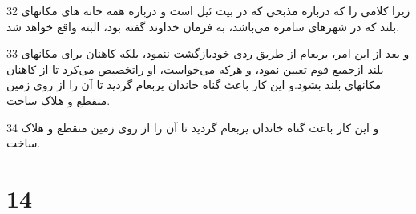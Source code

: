 \par 32 زیرا کلامی را که درباره مذبحی که در بیت ئیل است و درباره همه خانه های مکانهای بلند که در شهرهای سامره می‌باشد، به فرمان خداوند گفته بود، البته واقع خواهد شد.
\par 33 و بعد از این امر، یربعام از طریق ردی خودبازگشت ننمود، بلکه کاهنان برای مکانهای بلند ازجمیع قوم تعیین نمود، و هرکه می‌خواست، او راتخصیص می‌کرد تا از کاهنان مکانهای بلند بشود.و این کار باعث گناه خاندان یربعام گردید تا آن را از روی زمین منقطع و هلاک ساخت.
\par 34 و این کار باعث گناه خاندان یربعام گردید تا آن را از روی زمین منقطع و هلاک ساخت.
 
\chapter{14}

